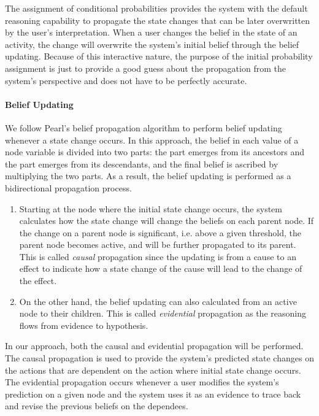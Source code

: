 The assignment of conditional probabilities provides the system with the default reasoning capability to propagate the state changes that can be later overwritten by the user's interpretation. When a user changes the belief in the state of an activity, the change will overwrite the system’s initial belief through the belief updating. Because of this interactive nature, the purpose of the initial probability assignment is just to provide a good guess about the propagation from the system's perspective and does not have to be perfectly accurate. 

\paragraph*{Belief Updating} %
\label{par:belief_updating}
We follow Pearl’s belief propagation algorithm \cite{pearl1988probabilistic} to perform belief updating whenever a state change occurs. In this approach, the belief in each value of a node variable is divided into two parts: the part emerges from its ancestors and the part emerges from its descendants, and the final belief is ascribed by multiplying the two parts. As a result, the belief updating is performed as a bidirectional propagation process. 
\begin{enumerate}
	\item Starting at the node where the initial state change occurs, the system calculates how the state change will change the beliefs on each parent node. If the change on a parent node is significant, i.e. above a given threshold, the parent node becomes active, and will be further propagated to its parent. This is called \emph{causal} propagation since the updating is from a cause to an effect to indicate how a state change of the cause will lead to the change of the effect. 
	\item On the other hand, the belief updating can also calculated from an active node to their children. This is called \emph{evidential} propagation as the reasoning flows from evidence to hypothesis.
\end{enumerate}

In our approach, both the causal and evidential propagation will be performed. The causal propagation is used to provide the system's predicted state changes on the actions that are dependent on the action where initial state change occurs. The evidential propagation occurs whenever a user modifies the system’s prediction on a given node and the system uses it as an evidence to trace back and revise the previous beliefs on the dependees.

